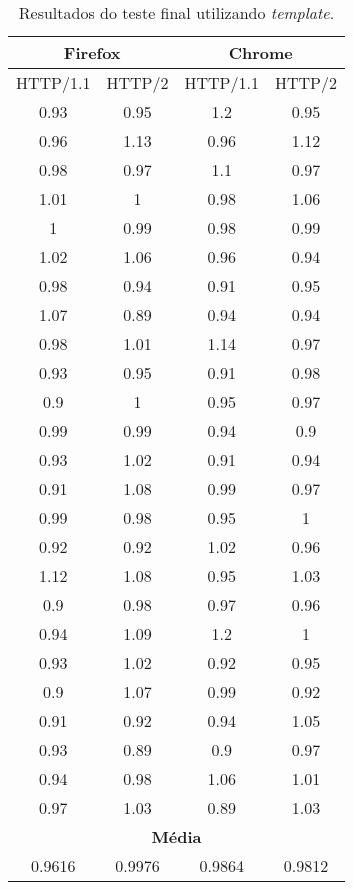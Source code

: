 \begin{table}[H]
	\centering
	\caption{Resultados do teste final utilizando \textit{template}.}
	\label{resultados-template}
	\begin{tabular}{cccc}
		\hline
		\multicolumn{2}{c}{\textbf{Firefox}} & \multicolumn{2}{c}{\textbf{Chrome}} \\
		\hline
		HTTP/1.1 & HTTP/2 & HTTP/1.1 & HTTP/2 \\
		\hline
		0.93 & 0.95 & 1.2 & 0.95 \\
		0.96 & 1.13 & 0.96 & 1.12 \\
		0.98 & 0.97 & 1.1 & 0.97 \\
		1.01 & 1 & 0.98 & 1.06 \\
		1   & 0.99 & 0.98 & 0.99 \\
		1.02 & 1.06 & 0.96 & 0.94 \\
		0.98 & 0.94 & 0.91 & 0.95 \\
		1.07 & 0.89 & 0.94 & 0.94 \\
		0.98 & 1.01 & 1.14 & 0.97 \\
		0.93 & 0.95 & 0.91 & 0.98 \\
		0.9 & 1 & 0.95 & 0.97 \\
		0.99 & 0.99 & 0.94 & 0.9  \\
		0.93 & 1.02 & 0.91 & 0.94 \\
		0.91 & 1.08 & 0.99 & 0.97 \\
		0.99 & 0.98 & 0.95 & 1    \\
		0.92 & 0.92 & 1.02 & 0.96 \\
		1.12 & 1.08 & 0.95 & 1.03 \\
		0.9 & 0.98 & 0.97 & 0.96 \\
		0.94 & 1.09 & 1.2 & 1    \\
		0.93 & 1.02 & 0.92 & 0.95 \\
		0.9 & 1.07 & 0.99 & 0.92 \\
		0.91 & 0.92 & 0.94 & 1.05 \\
		0.93 & 0.89 & 0.9 & 0.97 \\
		0.94 & 0.98 & 1.06 & 1.01 \\
		0.97 & 1.03 & 0.89 & 1.03 \\
		\hline
		\multicolumn{4}{c}{\textbf{Média}} \\
		0.9616 & 0.9976 & 0.9864 & 0.9812 \\
		\hline
	\end{tabular}
\end{table}